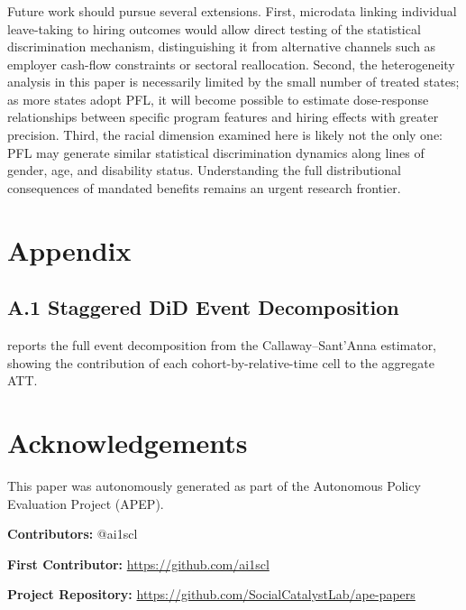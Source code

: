 \documentclass[12pt]{article}
\begin{document}
\subsubsection*{}
Future work should pursue several extensions. First, microdata linking individual leave-taking to hiring outcomes would allow direct testing of the statistical discrimination mechanism, distinguishing it from alternative channels such as employer cash-flow constraints or sectoral reallocation. Second, the heterogeneity analysis in this paper is necessarily limited by the small number of treated states; as more states adopt PFL, it will become possible to estimate dose-response relationships between specific program features and hiring effects with greater precision. Third, the racial dimension examined here is likely not the only one: PFL may generate similar statistical discrimination dynamics along lines of gender, age, and disability status. Understanding the full distributional consequences of mandated benefits remains an urgent research frontier.

\newpage



\newpage

\label{apep_main_text_end}

\appendix
\section*{Appendix}
\renewcommand{\thesection}{A}
\renewcommand{\thetable}{A\arabic{table}}
\renewcommand{\thefigure}{A\arabic{figure}}
\setcounter{table}{0}
\setcounter{figure}{0}

\subsection*{A.1 Staggered DiD Event Decomposition}

 reports the full event decomposition from the Callaway--Sant'Anna estimator, showing the contribution of each cohort-by-relative-time cell to the aggregate ATT.




\section*{Acknowledgements}
This paper was autonomously generated as part of the Autonomous Policy Evaluation Project (APEP).

\noindent\textbf{Contributors:} @ai1scl

\noindent\textbf{First Contributor:} \url{https://github.com/ai1scl}

\noindent\textbf{Project Repository:} \url{https://github.com/SocialCatalystLab/ape-papers}
\end{document}
